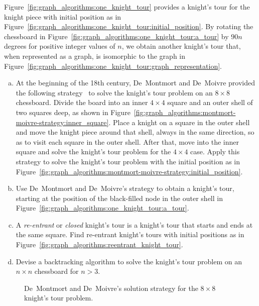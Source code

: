 \begin{problem}
\item Figure~\ref{fig:graph_algorithms:one_knight_tour} provides a
  knight's tour for the knight piece with initial position as in
  Figure~\ref{fig:graph_algorithms:one_knight_tour:initial_position}. By
  rotating the chessboard in
  Figure~\ref{fig:graph_algorithms:one_knight_tour:a_tour} by
  $90n$ degrees for positive integer values of $n$, we obtain another
  knight's tour that, when represented as a graph, is isomorphic to
  the graph in
  Figure~\ref{fig:graph_algorithms:one_knight_tour:graph_representation}.
  \begin{enumerate}[(a)]
  \item At the beginning of the 18th century, De~Montmort and
    De~Moivre provided the following
    strategy~\cite[p.176]{BallCoxeter1987} to solve the knight's tour
    problem on an $8 \times 8$ chessboard. Divide the board into an
    inner $4 \times 4$ square and an outer shell of two squares deep,
    as shown in
    Figure~\ref{fig:graph_algorithms:montmort-moivre-strategy:inner_square}.
    Place a knight on a square in the outer shell and move the knight
    piece around that shell, always in the same direction, so as to
    visit each square in the outer shell. After that, move into the
    inner square and solve the knight's tour problem for the
    $4 \times 4$ case. Apply this strategy to solve the knight's tour
    problem with the initial position as in
    Figure~\ref{fig:graph_algorithms:montmort-moivre-strategy:initial_position}.

  \item Use De~Montmort and De~Moivre's strategy to obtain a knight's
    tour, starting at the position of the black-filled node in the
    outer shell in
    Figure~\ref{fig:graph_algorithms:one_knight_tour:a_tour}.

  \item A \emph{re-entrant} or \emph{closed} knight's tour is a
    knight's tour that starts and ends at the same square. Find
    re-entrant knight's tours with initial positions as in
    Figure~\ref{fig:graph_algorithms:reentrant_knight_tour}.

  \item Devise a backtracking algorithm to solve the knight's tour
    problem on an $n \times n$ chessboard for $n > 3$.
  \end{enumerate}

\begin{figure}[!htbp]
\centering
{}

\caption{De~Montmort and De~Moivre's solution strategy for the
  $8 \times 8$ knight's tour problem.}
\label{fig:graph_algorithms:De_Montmort_De_Moivre_knight_tour_strategy}
\end{figure}


\end{problem}

